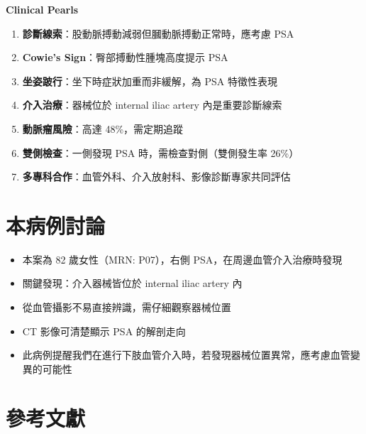 \documentclass[12pt,a4paper]{article}
\begin{document}
\begin{importantbox}
\textbf{Clinical Pearls}

\begin{enumerate}[leftmargin=*]
    \item \textbf{診斷線索}：股動脈搏動減弱但膕動脈搏動正常時，應考慮 PSA

    \item \textbf{Cowie's Sign}：臀部搏動性腫塊高度提示 PSA

    \item \textbf{坐姿跛行}：坐下時症狀加重而非緩解，為 PSA 特徵性表現

    \item \textbf{介入治療}：器械位於 internal iliac artery 內是重要診斷線索

    \item \textbf{動脈瘤風險}：高達 48\%，需定期追蹤

    \item \textbf{雙側檢查}：一側發現 PSA 時，需檢查對側（雙側發生率 26\%）

    \item \textbf{多專科合作}：血管外科、介入放射科、影像診斷專家共同評估
\end{enumerate}
\end{importantbox}

\section{本病例討論}

\begin{itemize}
    \item 本案為 82 歲女性（MRN: P07），右側 PSA，在周邊血管介入治療時發現
    \item 關鍵發現：介入器械皆位於 internal iliac artery 內
    \item 從血管攝影不易直接辨識，需仔細觀察器械位置
    \item CT 影像可清楚顯示 PSA 的解剖走向
    \item 此病例提醒我們在進行下肢血管介入時，若發現器械位置異常，應考慮血管變異的可能性
\end{itemize}

\section{參考文獻}
\end{document}
